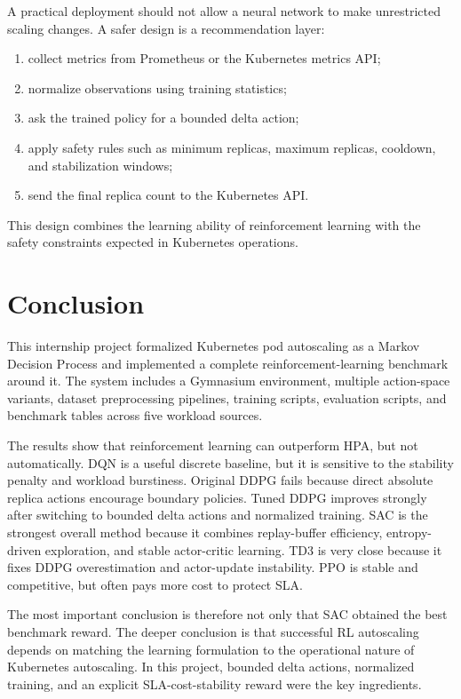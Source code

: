 \documentclass{rapportINPTCLOUD}
\begin{document}
A practical deployment should not allow a neural network to make unrestricted scaling changes. A safer design is a recommendation layer:

\begin{enumerate}
  \item collect metrics from Prometheus or the Kubernetes metrics API;
  \item normalize observations using training statistics;
  \item ask the trained policy for a bounded delta action;
  \item apply safety rules such as minimum replicas, maximum replicas, cooldown, and stabilization windows;
  \item send the final replica count to the Kubernetes API.
\end{enumerate}

This design combines the learning ability of reinforcement learning with the safety constraints expected in Kubernetes operations.

\chapter{Conclusion}
\label{chap:conclusion}

This internship project formalized Kubernetes pod autoscaling as a Markov Decision Process and implemented a complete reinforcement-learning benchmark around it. The system includes a Gymnasium environment, multiple action-space variants, dataset preprocessing pipelines, training scripts, evaluation scripts, and benchmark tables across five workload sources.

The results show that reinforcement learning can outperform HPA, but not automatically. DQN is a useful discrete baseline, but it is sensitive to the stability penalty and workload burstiness. Original DDPG fails because direct absolute replica actions encourage boundary policies. Tuned DDPG improves strongly after switching to bounded delta actions and normalized training. SAC is the strongest overall method because it combines replay-buffer efficiency, entropy-driven exploration, and stable actor-critic learning. TD3 is very close because it fixes DDPG overestimation and actor-update instability. PPO is stable and competitive, but often pays more cost to protect SLA.

The most important conclusion is therefore not only that SAC obtained the best benchmark reward. The deeper conclusion is that successful RL autoscaling depends on matching the learning formulation to the operational nature of Kubernetes autoscaling. In this project, bounded delta actions, normalized training, and an explicit SLA-cost-stability reward were the key ingredients.

\clearpage
\printbibliography
\end{document}
